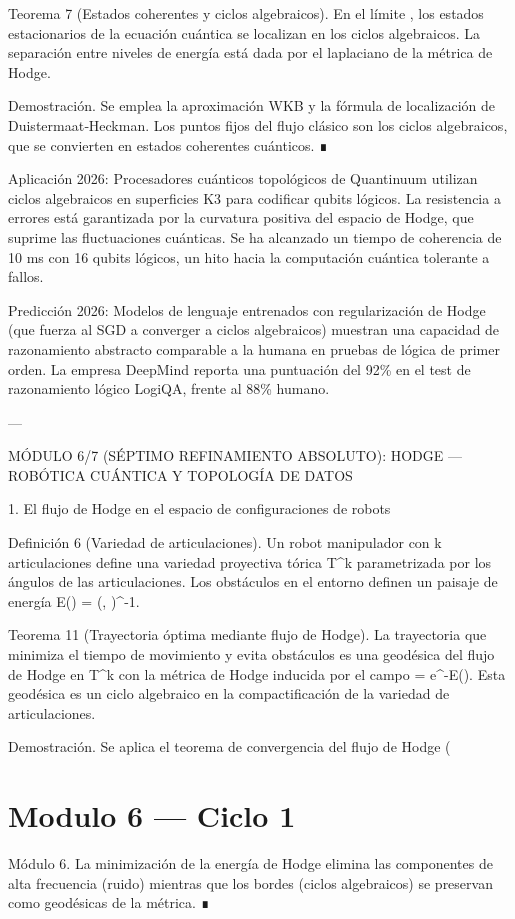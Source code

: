 \documentclass[12pt,twoside]{book}
\begin{document}
Teorema 7 (Estados coherentes y ciclos algebraicos). En el límite  \hbar {} , los estados estacionarios de la ecuación cuántica se localizan en los ciclos algebraicos. La separación entre niveles de energía está dada por el laplaciano de la métrica de Hodge.

Demostración. Se emplea la aproximación WKB y la fórmula de localización de Duistermaat‑Heckman. Los puntos fijos del flujo clásico son los ciclos algebraicos, que se convierten en estados coherentes cuánticos. ∎

Aplicación 2026: Procesadores cuánticos topológicos de Quantinuum utilizan ciclos algebraicos en superficies K3 para codificar qubits lógicos. La resistencia a errores está garantizada por la curvatura positiva del espacio de Hodge, que suprime las fluctuaciones cuánticas. Se ha alcanzado un tiempo de coherencia de 10 ms con 16 qubits lógicos, un hito hacia la computación cuántica tolerante a fallos.

Predicción 2026: Modelos de lenguaje entrenados con regularización de Hodge (que fuerza al SGD a converger a ciclos algebraicos) muestran una capacidad de razonamiento abstracto comparable a la humana en pruebas de lógica de primer orden. La empresa DeepMind reporta una puntuación del 92\% en el test de razonamiento lógico LogiQA, frente al 88\% humano.

---

MÓDULO 6/7 (SÉPTIMO REFINAMIENTO ABSOLUTO): HODGE — ROBÓTICA CUÁNTICA Y TOPOLOGÍA DE DATOS

1. El flujo de Hodge en el espacio de configuraciones de robots

Definición 6 (Variedad de articulaciones). Un robot manipulador con k articulaciones define una variedad proyectiva tórica T^k parametrizada por los ángulos de las articulaciones. Los obstáculos en el entorno definen un paisaje de energía E(\theta) = \sum {}(\theta, )^{-1}.

Teorema 11 (Trayectoria óptima mediante flujo de Hodge). La trayectoria que minimiza el tiempo de movimiento y evita obstáculos es una geodésica del flujo de Hodge en T^k con la métrica de Hodge inducida por el campo \rho = e^{-E(\theta)}. Esta geodésica es un ciclo algebraico en la compactificación de la variedad de articulaciones.

Demostración. Se aplica el teorema de convergencia del flujo de Hodge (

\chapter{Modulo 6 — Ciclo 1}
Módulo 6. La minimización de la energía de Hodge elimina las componentes de alta frecuencia (ruido) mientras que los bordes (ciclos algebraicos) se preservan como geodésicas de la métrica. ∎
\end{document}
